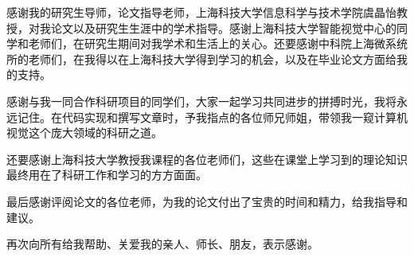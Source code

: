 感谢我的研究生导师，论文指导老师，上海科技大学信息科学与技术学院虞晶怡教授，对我论文以及研究生生涯中的学术指导。感谢上海科技大学智能视觉中心的同学和老师们，在研究生期间对我学术和生活上的关心。还要感谢中科院上海微系统所的老师们，在我得以在上海科技大学得到学习的机会，以及在毕业论文方面给我的支持。

感谢与我一同合作科研项目的同学们，大家一起学习共同进步的拼搏时光，我将永远记住。在代码实现和撰写文章时，予我指点的各位师兄师姐，带领我一窥计算机视觉这个庞大领域的科研之道。

还要感谢上海科技大学教授我课程的各位老师们，这些在课堂上学习到的理论知识最终用在了科研工作和学习的方方面面。

最后感谢评阅论文的各位老师，为我的论文付出了宝贵的时间和精力，给我指导和建议。

再次向所有给我帮助、关爱我的亲人、师长、朋友，表示感谢。

\cleardoublepage[plain]%
